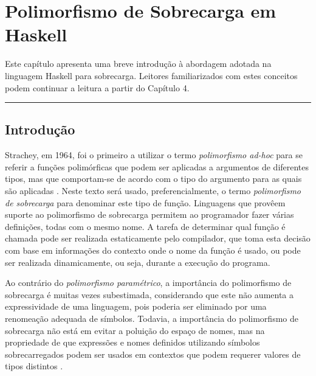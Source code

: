 \chapter{Polimorfismo de Sobrecarga em Haskell}\label{sobrecarga}

Este cap\'itulo apresenta uma breve introdu\c{c}\~ao \`a abordagem adotada na 
linguagem Haskell para sobrecarga. Leitores fa\-mi\-li\-a\-ri\-za\-dos com estes 
conceitos podem continuar a leitura a partir do Cap\'itulo 4.

\noindent\rule{15.5cm}{0.2mm}

\section{Introdu\c{c}\~ao}

Strachey, em 1964, foi o primeiro a utilizar o termo \emph{polimorfismo ad-hoc} 
para se referir a fun\c{c}\~oes polim\'orficas que podem ser aplicadas a
argumentos de diferentes tipos, mas que comportam-se de acordo com o tipo do
argumento para as quais s\~ao aplicadas \cite{Strachey00}. Neste texto ser\'a usado,
preferencialmente, o termo \emph{polimorfismo de sobrecarga} para denominar
este tipo de fun\c{c}\~ao. Linguagens que prov\^eem suporte ao polimorfismo de
sobrecarga permitem ao programador fazer v\'arias defini\c{c}\~oes, todas com o mesmo nome. A
tarefa de determinar qual fun\c{c}\~ao \'e chamada pode ser realizada
estaticamente pelo compilador, que toma esta decis\~ao com base em
informa\c{c}\~oes do contexto onde o nome da fun\c{c}\~ao \'e usado, ou pode ser
realizada dinamicamente, ou seja, durante a execu\c{c}\~ao do programa.

Ao contr\'ario do \emph{polimorfismo param\'etrico}, a import\^ancia do
polimorfismo de sobrecarga \'e muitas vezes subestimada, considerando que este
n\~ao aumenta a expressividade de uma linguagem, pois poderia ser eliminado por
uma renomea\c{c}\~ao adequada de s\'imbolos. Todavia, a import\^ancia do
polimorfismo de sobrecarga n\~ao est\'a em evitar a polui\c{c}\~ao do espa\c{c}o
de nomes, mas na propriedade de que express\~oes e nomes definidos utilizando
s\'imbolos sobrecarregados podem ser usados em contextos que podem requerer
valores de tipos distintos \cite{Camarao99a}.


